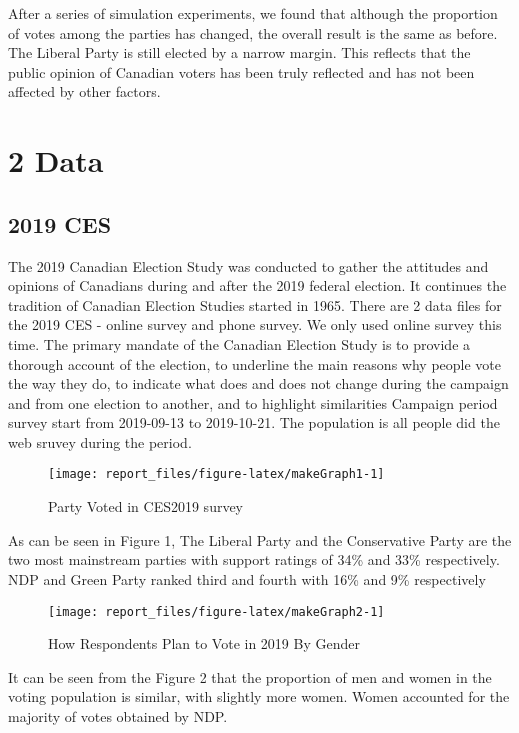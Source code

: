 \documentclass[
  12pt,
]{article}
\begin{document}
After a series of simulation experiments, we found that although the
proportion of votes among the parties has changed, the overall result is
the same as before. The Liberal Party is still elected by a narrow
margin. This reflects that the public opinion of Canadian voters has
been truly reflected and has not been affected by other factors.

\hypertarget{data}{%
\section{2 Data}\label{data}}

\hypertarget{ces}{%
\subsection{2019 CES}\label{ces}}

The 2019 Canadian Election Study was conducted to gather the attitudes
and opinions of Canadians during and after the 2019 federal election. It
continues the tradition of Canadian Election Studies started in 1965.
There are 2 data files for the 2019 CES - online survey and phone
survey. We only used online survey this time. The primary mandate of the
Canadian Election Study is to provide a thorough account of the
election, to underline the main reasons why people vote the way they do,
to indicate what does and does not change during the campaign and from
one election to another, and to highlight similarities Campaign period
survey start from 2019-09-13 to 2019-10-21. The population is all people
did the web sruvey during the period.

\begin{figure}
\texttt{[image: report\_files/figure-latex/makeGraph1-1]} \caption{Party Voted in CES2019 survey}\label{fig:makeGraph1}
\end{figure}

As can be seen in Figure 1, The Liberal Party and the Conservative Party
are the two most mainstream parties with support ratings of 34\% and
33\% respectively. NDP and Green Party ranked third and fourth with 16\%
and 9\% respectively

\begin{figure}
\texttt{[image: report\_files/figure-latex/makeGraph2-1]} \caption{How Respondents Plan to Vote in 2019 By Gender}\label{fig:makeGraph2}
\end{figure}

It can be seen from the Figure 2 that the proportion of men and women in
the voting population is similar, with slightly more women. Women
accounted for the majority of votes obtained by NDP.
\end{document}
